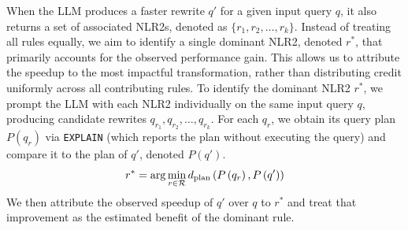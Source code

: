 When the LLM produces a faster rewrite $q'$ for a given input query $q$, it also returns a set of associated NLR2s, denoted as $\{r_1, r_2, \ldots, r_k\}$. Instead of treating all rules equally, we aim to identify a single dominant NLR2, denoted $r^*$, that primarily accounts for the observed performance gain. This allows us to attribute the speedup to the most impactful transformation, rather than distributing credit uniformly across all contributing rules. To identify the dominant NLR2 $r^*$, we prompt the LLM with each NLR2 individually on the same input query $q$, producing candidate rewrites ${q_{r_1}, q_{r_2}, \ldots, q_{r_k}}$. For each $q_r$, we obtain its query plan $P(q_r)$ via \texttt{EXPLAIN} (which reports the plan without executing the query) and compare it to the plan of $q'$, denoted $P(q')$. 
    \[
    { 
    {r^*=\arg \min _{r \in \mathcal{R}} d_{\text {plan}}\left(P\left(q_r\right), P\left(q^{\prime}\right)\right)
    }}
\]
\noindent{} We then attribute the observed speedup of $q'$ over $q$ to $r^*$ and treat that improvement as the estimated benefit of the dominant rule.





